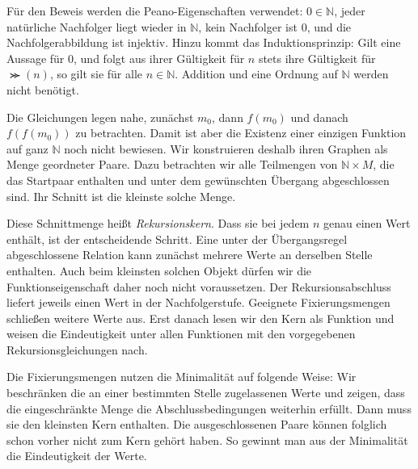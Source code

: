 Für den Beweis werden die Peano-Eigenschaften verwendet:
\(0\in\mathbb N\), jeder natürliche Nachfolger liegt wieder in
\(\mathbb N\), kein Nachfolger ist \(0\), und die
Nachfolgerabbildung ist injektiv. Hinzu kommt das Induktionsprinzip:
Gilt eine Aussage für \(0\), und folgt aus ihrer Gültigkeit für
\(n\) stets ihre Gültigkeit für \(\Succ(n)\), so gilt sie für
alle \(n\in\mathbb N\).
Addition und eine Ordnung auf \(\mathbb N\) werden nicht benötigt.

Die Gleichungen legen nahe, zunächst \(m_0\), dann \(f(m_0)\)
und danach \(f(f(m_0))\) zu betrachten. Damit ist aber die Existenz
einer einzigen Funktion auf ganz \(\mathbb N\) noch nicht bewiesen.
Wir konstruieren deshalb ihren Graphen als Menge geordneter Paare.
Dazu betrachten wir alle Teilmengen von \(\mathbb N\times M\),
die das Startpaar enthalten und unter dem gewünschten Übergang
abgeschlossen sind. Ihr Schnitt ist die kleinste solche Menge.

Diese Schnittmenge heißt \emph{Rekursionskern}. Dass sie bei jedem
\(n\) genau einen Wert enthält, ist der entscheidende Schritt.
Eine unter der Übergangsregel abgeschlossene Relation kann zunächst
mehrere Werte an derselben Stelle enthalten. Auch beim kleinsten
solchen Objekt dürfen wir die Funktionseigenschaft daher noch nicht
voraussetzen.
Der Rekursionsabschluss liefert jeweils einen Wert in der
Nachfolgerstufe. Geeignete Fixierungsmengen schließen weitere Werte
aus. Erst danach lesen wir den Kern als Funktion und weisen die
Eindeutigkeit unter allen Funktionen mit den vorgegebenen
Rekursionsgleichungen nach.

Die Fixierungsmengen nutzen die Minimalität auf folgende Weise:
Wir beschränken
die an einer bestimmten Stelle zugelassenen Werte und zeigen, dass
die eingeschränkte Menge die Abschlussbedingungen weiterhin erfüllt.
Dann muss sie den kleinsten Kern enthalten. Die ausgeschlossenen
Paare können folglich schon vorher nicht zum Kern gehört haben.
So gewinnt man aus der Minimalität die Eindeutigkeit der Werte.

\par{}
